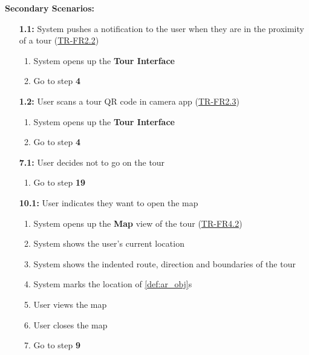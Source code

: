 \documentclass{article}
\begin{document}
\begin{enumerate}[label=\textbf{UC\arabic*}]
          \textbf{Secondary Scenarios:}
          \begin{itemize}
              \item[{\bf 1.1:}] System pushes a notification to the user when they are in the proximity of a tour (\hyperref[ssub:touring]{TR-FR2.2})
                    \begin{enumerate}[label=\textbf{\arabic*.}]
                        \item System opens up the \textbf{Tour Interface}
                        \item Go to step \textbf{4}
                    \end{enumerate}
              \item[{\bf 1.2:}] User scans a tour QR code in camera app (\hyperref[ssub:touring]{TR-FR2.3})
                    \begin{enumerate}[label=\textbf{\arabic*.}]
                        \item System opens up the \textbf{Tour Interface}
                        \item Go to step \textbf{4}
                    \end{enumerate}
              \item[{\bf 7.1:}] User decides not to go on the tour
                    \begin{enumerate}[label=\textbf{\arabic*.}]
                        \item Go to step \textbf{19}
                    \end{enumerate}
              \item[{\bf 10.1:}] User indicates they want to open the map
                    \begin{enumerate}[label=\textbf{\arabic*.}]
                        \item System opens up the \textbf{Map} view of the tour (\hyperref[ssub:touring]{TR-FR4.2})
                        \item System shows the user’s current location
                        \item System shows the indented route, direction and boundaries of the tour
                        \item System marks the location of \ref{def:ar_obj}s
                        \item User views the map
                        \item User closes the map
                        \item Go to step \textbf{9}

\end{enumerate}
\end{itemize}
\end{enumerate}
\end{document}
